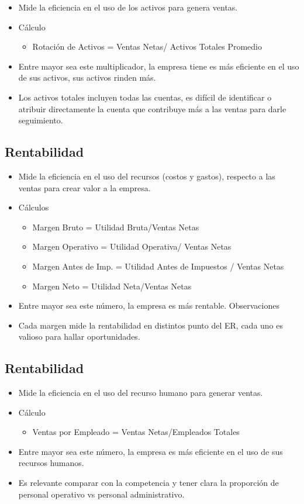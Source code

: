 \begin{itemize}
    \item  Mide la eficiencia en el uso de los activos para genera ventas. 
    \item Cálculo 
    \begin{itemize}
        \item Rotación de Activos = Ventas Netas/ Activos Totales Promedio 
    \end{itemize}
    \item Entre mayor sea este multiplicador, la empresa tiene es más eficiente en el uso de sus activos, sus activos rinden más. 
    \item Los activos totales incluyen todas las cuentas, es difícil de identificar o atribuir 
    directamente la cuenta que contribuye más a las ventas para darle seguimiento.
\end{itemize}
\subsection{Rentabilidad}
\begin{itemize}
    \item  Mide  la  eficiencia  en  el  uso  del  recursos  (costos  y  gastos),  respecto  a  las  ventas  para  crear  valor  a  la 
    empresa. 
    \item Cálculos 
    \begin{itemize}
        \item Margen Bruto =  Utilidad Bruta/Ventas Netas 
        \item Margen Operativo =  Utilidad Operativa/ Ventas Netas 
        \item Margen Antes de Imp. =  Utilidad Antes de Impuestos / Ventas Netas 
        \item  Margen Neto =  Utilidad Neta/Ventas Netas 
    \end{itemize}
 
    \item Entre mayor sea este número, la empresa es más rentable. 
    Observaciones 
    \item Cada margen mide la rentabilidad en distintos punto del ER, cada uno es valioso para hallar oportunidades.
\end{itemize}
\subsection{Rentabilidad}
\begin{itemize}
    \item Mide la eficiencia en el uso del recurso humano para generar ventas. 
    \item Cálculo 
    \begin{itemize}
        \item Ventas por Empleado = Ventas Netas/Empleados Totales 
    \end{itemize}
    \item Entre mayor sea este número, la empresa es más eficiente en el uso de sus recursos humanos. 
    \item Es  relevante  comparar  con  la  competencia  y  tener  clara  la  proporción  de personal operativo vs personal administrativo.
\end{itemize}

